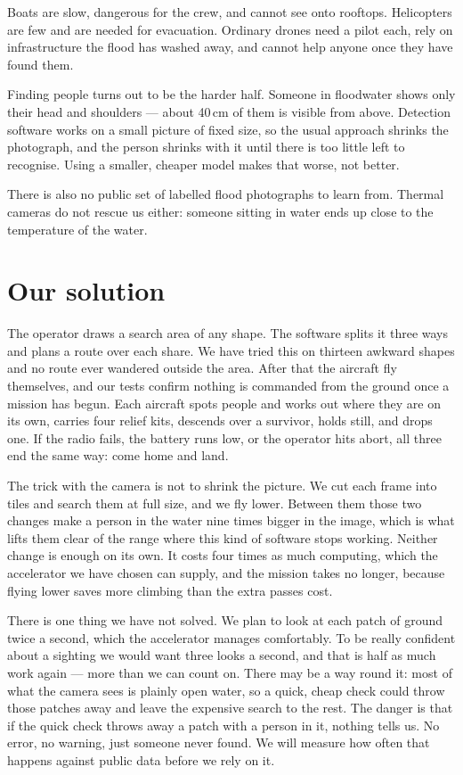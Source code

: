 \documentclass[11pt,a4paper]{article}
\begin{document}
Boats are slow, dangerous for the crew, and cannot see onto rooftops.
Helicopters are few and are needed for evacuation. Ordinary drones need a pilot
each, rely on infrastructure the flood has washed away, and cannot help anyone
once they have found them.

Finding people turns out to be the harder half. Someone in floodwater shows
only their head and shoulders --- about 40\,cm of them is visible from above.
Detection software works on a small picture of fixed size, so the usual
approach shrinks the photograph, and the person shrinks with it until there is
too little left to recognise. Using a smaller, cheaper model makes that worse,
not better.

There is also no public set of labelled flood photographs to learn from. Thermal
cameras do not rescue us either: someone sitting in water ends up close to the
temperature of the water.

\section{Our solution}

The operator draws a search area of any shape. The software splits it three
ways and plans a route over each share. We have tried this on thirteen awkward
shapes and no route ever wandered outside the area. After that the aircraft fly
themselves, and our tests confirm nothing is commanded from the ground once a
mission has begun. Each aircraft spots people and works out where they are on
its own, carries four relief kits, descends over a survivor, holds still, and
drops one. If the radio fails, the battery runs low, or the operator hits
abort, all three end the same way: come home and land.

The trick with the camera is not to shrink the picture. We cut each frame into
tiles and search them at full size, and we fly lower. Between them those two
changes make a person in the water nine times bigger in the image, which is
what lifts them clear of the range where this kind of software stops working.
Neither change is enough on its own. It costs four times as much computing,
which the accelerator we have chosen can supply, and the mission takes no
longer, because flying lower saves more climbing than the extra passes cost.

There is one thing we have not solved. We plan to look at each patch of ground
twice a second, which the accelerator manages comfortably. To be really
confident about a sighting we would want three looks a second, and that is half
as much work again --- more than we can count on. There may be a way round it:
most of what the camera sees is plainly open water, so a quick, cheap check
could throw those patches away and leave the expensive search to the rest. The
danger is that if the quick check throws away a patch with a person in it,
nothing tells us. No error, no warning, just someone never found. We will
measure how often that happens against public data before we rely on it.
\end{document}
